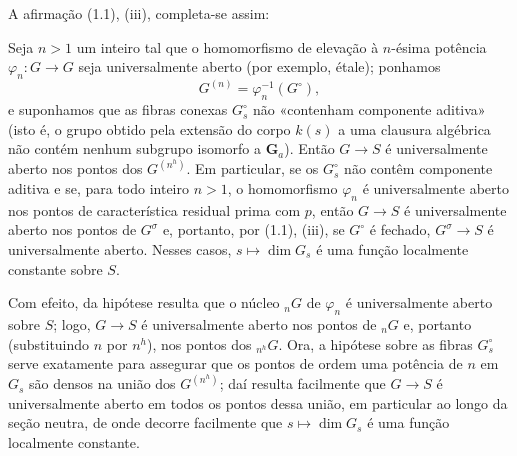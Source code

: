 A afirmação (1.1), (iii), completa-se assim:

 Seja $n>1$ um inteiro tal que o homomorfismo de
elevação à $n$-ésima potência $\varphi_n:G\longrightarrow G$ seja
universalmente aberto (por exemplo, étale); ponhamos
\[
G^{(n)}=\varphi_n^{-1}(G^\circ),
\]
e suponhamos que as fibras conexas $G_s^\circ$ não «contenham
componente aditiva» (isto é, o grupo obtido pela extensão do corpo $k(s)$ a
uma clausura algébrica não contém nenhum subgrupo isomorfo a
$\mathbf G_a$). Então $G\longrightarrow S$ é universalmente aberto nos
pontos dos $G^{(n^h)}$. Em particular, se os $G_s^\circ$ não contêm componente
aditiva e se, para todo inteiro $n>1$, o homomorfismo $\varphi_n$ é
universalmente aberto nos pontos de característica residual prima com
$p$, então
$G\longrightarrow S$ é universalmente aberto nos pontos de $G^\sigma$ e,
portanto, por (1.1), (iii), se $G^\circ$ é fechado,
$G^\sigma\longrightarrow S$ é universalmente aberto. Nesses casos,
$s\longmapsto\dim G_s$ é uma função localmente constante sobre $S$.

Com efeito, da hipótese resulta que o núcleo ${}_nG$ de $\varphi_n$ é
universalmente aberto sobre $S$; logo, $G\longrightarrow S$ é universalmente
aberto nos pontos de ${}_nG$ e, portanto (substituindo $n$ por $n^h$), nos
pontos dos ${}_{n^h}G$. Ora, a hipótese sobre as fibras $G_s^\circ$ serve
exatamente para assegurar que os pontos de ordem uma potência de $n$ em $G_s$
são densos na união dos $G^{(n^h)}$; daí resulta facilmente que
$G\longrightarrow S$ é universalmente aberto em todos os pontos dessa união,
em particular ao longo da seção neutra, de onde decorre facilmente que
$s\longmapsto\dim G_s$ é uma função localmente constante.

